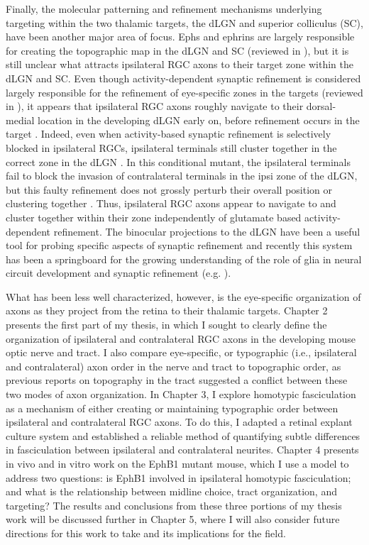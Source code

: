 Finally, the molecular patterning and refinement mechanisms underlying targeting within the two thalamic targets, the dLGN and superior colliculus (SC), have been another major area of focus.
Ephs and ephrins are largely responsible for creating the topographic map in the dLGN and SC (reviewed in ), but it is still unclear what attracts ipsilateral RGC axons to their target zone within the dLGN and SC.
Even though activity-dependent synaptic refinement is considered largely responsible for the refinement of eye-specific zones in the targets (reviewed in ), it appears that ipsilateral RGC axons roughly navigate to their dorsal-medial location in the developing dLGN early on, before refinement occurs in the target \cite{jaubert2005structural}.
Indeed, even when activity-based synaptic refinement is selectively blocked in ipsilateral RGCs, ipsilateral terminals still cluster together in the correct zone in the dLGN \cite{koch2011pathway}.
In this conditional mutant, the ipsilateral terminals fail to block the invasion of contralateral terminals in the ipsi zone of the dLGN, but this faulty refinement does not grossly perturb their overall position or clustering together \cite{koch2011pathway}.
Thus, ipsilateral RGC axons appear to navigate to and cluster together within their zone independently of glutamate based activity-dependent refinement.
The binocular projections to the dLGN have been a useful tool for probing specific aspects of synaptic refinement and recently this system has been a springboard for the growing understanding of the role of glia in neural circuit development and synaptic refinement (e.g. ).

What has been less well characterized, however, is the eye-specific organization of axons as they project from the retina to their thalamic targets.
Chapter 2 presents the first part of my thesis, in which I sought to clearly define the organization of ipsilateral and contralateral RGC axons in the developing mouse optic nerve and tract.
I also compare eye-specific, or typographic (i.e., ipsilateral and contralateral) axon order in the nerve and tract to topographic order, as previous reports on topography in the tract suggested a conflict between these two modes of axon organization.
In Chapter 3, I explore homotypic fasciculation as a mechanism of either creating or maintaining typographic order between ipsilateral and contralateral RGC axons.
To do this, I adapted a retinal explant culture system and established a reliable method of quantifying subtle differences in fasciculation between ipsilateral and contralateral neurites.
Chapter 4 presents in vivo and in vitro work on the EphB1 mutant mouse, which I use a model to address two questions: is EphB1 involved in ipsilateral homotypic fasciculation; and what is the relationship between midline choice, tract organization, and targeting?
The results and conclusions from these three portions of my thesis work will be discussed further in Chapter 5, where I will also consider future directions for this work to take and its implications for the field.

